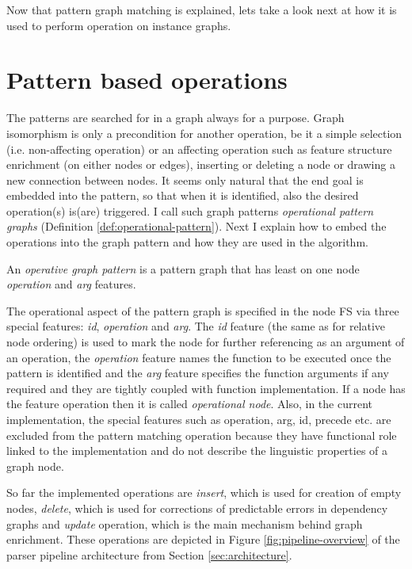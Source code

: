 Now that pattern graph matching is explained, lets take a look next at how it is used to perform operation on instance graphs.

\section{Pattern based operations}
\label{sec:pattern-based-operations}

The patterns are searched for in a graph always for a purpose. Graph isomorphism is only a precondition for another operation, be it a simple selection (i.e. non-affecting operation) or an affecting operation such as feature structure enrichment (on either nodes or edges), inserting or deleting a node or drawing a new connection between nodes. It seems only natural that the end goal is embedded into the pattern, so that when it is identified, also the desired operation(s) is(are) triggered. I call such graph patterns \textit{operational pattern graphs} (Definition \ref{def:operational-pattern}). Next I explain how to embed the operations into the graph pattern and how they are used in the algorithm. 

\begin{definition}\label{def:operational-pattern}
    An \textit{operative graph pattern} is a pattern graph that has least on one node \textit{operation} and \textit{arg} features.
\end{definition}

The operational aspect of the pattern graph is specified in the node FS via three special features: \textit{id}, \textit{operation} and \textit{arg}. The \textit{id} feature (the same as for relative node ordering) is used to mark the node for further referencing as an argument of an operation, the \textit{operation} feature names the function to be executed once the pattern is identified and the \textit{arg} feature specifies the function arguments if any required and they are tightly coupled with function implementation. If a node has the feature operation then it is called \textit{operational node}. Also, in the current implementation, the special features such as operation, arg, id, precede etc. are excluded from the pattern matching operation because they have functional role linked to the implementation and do not describe the linguistic properties of a graph node.

So far the implemented operations are \textit{insert}, which is used for creation of empty nodes, \textit{delete}, which is used for corrections of predictable errors in dependency graphs and \textit{update} operation, which is the main mechanism behind graph enrichment. These operations are depicted in Figure \ref{fig:pipeline-overview} of the parser pipeline architecture from Section \ref{sec:architecture}.

